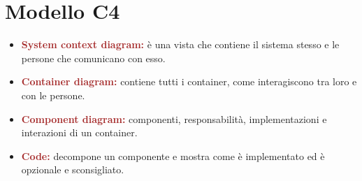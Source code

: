 \section{Modello C4}
\begin{itemize}
    \item \textbf{\textcolor{brown}{System context diagram:}} è una vista che contiene il sistema stesso e le persone che comunicano con esso.
    \item \textbf{\textcolor{brown}{Container diagram:}} contiene tutti i container, come interagiscono tra loro e con le persone.
    \item \textbf{\textcolor{brown}{Component diagram:}} componenti, responsabilità, implementazioni e interazioni di un container.
    \item \textbf{\textcolor{brown}{Code:}} decompone un componente e mostra come è implementato ed è opzionale e sconsigliato.
\end{itemize}

